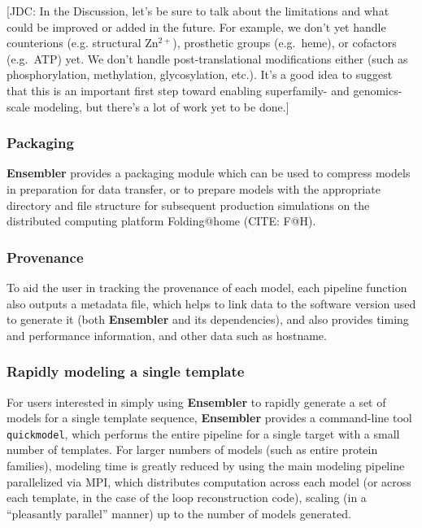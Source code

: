 \documentclass[aps,pre,twocolumn,nofootinbib,superscriptaddress,linenumbers]{revtex4-1}
\begin{document}
{\color{red}[JDC: In the Discussion, let's be sure to talk about the limitations and what could be improved or added in the future.  For example, we don't yet handle counterions (e.g. structural Zn$^{2+}$), prosthetic groups (e.g.~heme), or cofactors (e.g.~ATP) yet.  We don't handle post-translational modifications either (such as phosphorylation, methylation, glycosylation, etc.).  It's a good idea to suggest that this is an important first step toward enabling superfamily- and genomics-scale modeling, but there's a lot of work yet to be done.]}

\subsubsection{Packaging}

{\bf Ensembler} provides a packaging module which can be used to compress models in preparation for data transfer, or to prepare models with the appropriate directory and file structure for subsequent production simulations on the distributed computing platform Folding@home (CITE: F@H).

\subsubsection{Provenance}

To aid the user in tracking the provenance of each model, each pipeline function also outputs a metadata file, which helps to link data to the software version used to generate it (both {\bf Ensembler} and its dependencies), and also provides timing and performance information, and other data such as hostname.

\subsubsection{Rapidly modeling a single template}

For users interested in simply using {\bf Ensembler} to rapidly generate a set of models for a single template sequence, {\bf Ensembler} provides a command-line tool {\tt quickmodel}, which performs the entire pipeline for a single target with a small number of templates.
For larger numbers of models (such as entire protein families), modeling time is greatly reduced by using the main modeling pipeline parallelized via MPI, which distributes computation across each model (or across each template, in the case of the loop reconstruction code), scaling (in a ``pleasantly parallel'' manner) up to the number of models generated.
\end{document}
